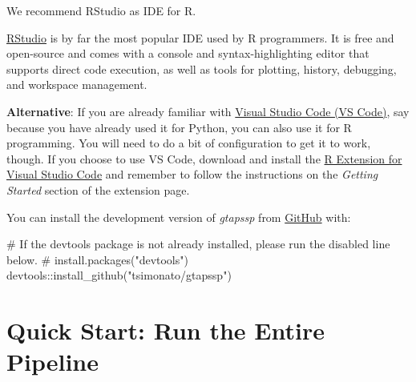 \documentclass[
  letterpaper,
  DIV=11,
  numbers=noendperiod]{scrartcl}
\newenvironment{Shaded}{}{}
\newcommand{\CommentTok}[1]{\textcolor[rgb]{0.54,0.53,0.53}{#1}}
\newcommand{\FunctionTok}[1]{\textcolor[rgb]{0.39,0.29,0.61}{#1}}
\newcommand{\NormalTok}[1]{\textcolor[rgb]{0.12,0.11,0.11}{#1}}
\newcommand{\SpecialCharTok}[1]{\textcolor[rgb]{0.24,0.68,0.91}{#1}}
\newcommand{\StringTok}[1]{\textcolor[rgb]{0.75,0.01,0.01}{#1}}
\begin{document}
\begin{tcolorbox}[enhanced jigsaw, titlerule=0mm, breakable, arc=.35mm, opacitybacktitle=0.6, toprule=.15mm, opacityback=0, leftrule=.75mm, left=2mm, coltitle=black, colback=white, title=\textcolor{quarto-callout-tip-color}{\faLightbulb}\hspace{0.5em}{IDE install details}, colbacktitle=quarto-callout-tip-color!10!white, rightrule=.15mm, colframe=quarto-callout-tip-color-frame, bottomtitle=1mm, toptitle=1mm, bottomrule=.15mm]

We recommend RStudio as IDE for R.

\href{https://posit.co/download/rstudio-desktop/}{RStudio} is by far the
most popular IDE used by R programmers. It is free and open-source and
comes with a console and syntax-highlighting editor that supports direct
code execution, as well as tools for plotting, history, debugging, and
workspace management.

\textbf{Alternative}: If you are already familiar with
\href{https://code.visualstudio.com/}{Visual Studio Code (VS Code)}, say
because you have already used it for Python, you can also use it for R
programming. You will need to do a bit of configuration to get it to
work, though. If you choose to use VS Code, download and install the
\href{https://marketplace.visualstudio.com/items?itemName=Ikuyadeu.r}{R
Extension for Visual Studio Code} and remember to follow the
instructions on the \emph{Getting Started} section of the extension
page.

\end{tcolorbox}

You can install the development version of \emph{gtapssp} from
\href{https://github.com/tsimonato/gtapssp}{GitHub} with:

\begin{Shaded}
\begin{Highlighting}[]
\CommentTok{\# If the devtools package is not already installed, please run the disabled line below.}
\CommentTok{\# install.packages("devtools")}
\NormalTok{devtools}\SpecialCharTok{::}\FunctionTok{install\_github}\NormalTok{(}\StringTok{"tsimonato/gtapssp"}\NormalTok{)}
\end{Highlighting}
\end{Shaded}

\section{Quick Start: Run the Entire
Pipeline}\label{quick-start-run-the-entire-pipeline}
\end{document}
